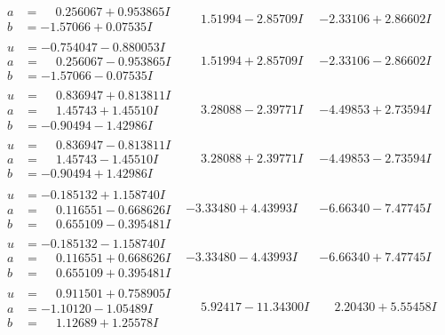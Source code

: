 \documentclass[1p]{elsarticle_modified}
\theoremstyle{definition}
\begin{document}
$$\begin{array}{c|c|c}
\begin{aligned}
a &= \phantom{-}0.256067 + 0.953865 I \\
b &= -1.57066 + 0.07535 I\end{aligned}
 & \phantom{-}1.51994 - 2.85709 I & -2.33106 + 2.86602 I \\ \hline\begin{aligned}
u &= -0.754047 - 0.880053 I \\
a &= \phantom{-}0.256067 - 0.953865 I \\
b &= -1.57066 - 0.07535 I\end{aligned}
 & \phantom{-}1.51994 + 2.85709 I & -2.33106 - 2.86602 I \\ \hline\begin{aligned}
u &= \phantom{-}0.836947 + 0.813811 I \\
a &= \phantom{-}1.45743 + 1.45510 I \\
b &= -0.90494 - 1.42986 I\end{aligned}
 & \phantom{-}3.28088 - 2.39771 I & -4.49853 + 2.73594 I \\ \hline\begin{aligned}
u &= \phantom{-}0.836947 - 0.813811 I \\
a &= \phantom{-}1.45743 - 1.45510 I \\
b &= -0.90494 + 1.42986 I\end{aligned}
 & \phantom{-}3.28088 + 2.39771 I & -4.49853 - 2.73594 I \\ \hline\begin{aligned}
u &= -0.185132 + 1.158740 I \\
a &= \phantom{-}0.116551 - 0.668626 I \\
b &= \phantom{-}0.655109 - 0.395481 I\end{aligned}
 & -3.33480 + 4.43993 I & -6.66340 - 7.47745 I \\ \hline\begin{aligned}
u &= -0.185132 - 1.158740 I \\
a &= \phantom{-}0.116551 + 0.668626 I \\
b &= \phantom{-}0.655109 + 0.395481 I\end{aligned}
 & -3.33480 - 4.43993 I & -6.66340 + 7.47745 I \\ \hline\begin{aligned}
u &= \phantom{-}0.911501 + 0.758905 I \\
a &= -1.10120 - 1.05489 I \\
b &= \phantom{-}1.12689 + 1.25578 I\end{aligned}
 & \phantom{-}5.92417 - 11.34300 I & \phantom{-}2.20430 + 5.55458 I \\ \hline\begin{aligned}

\end{aligned}
\end{array}$$
\end{document}
